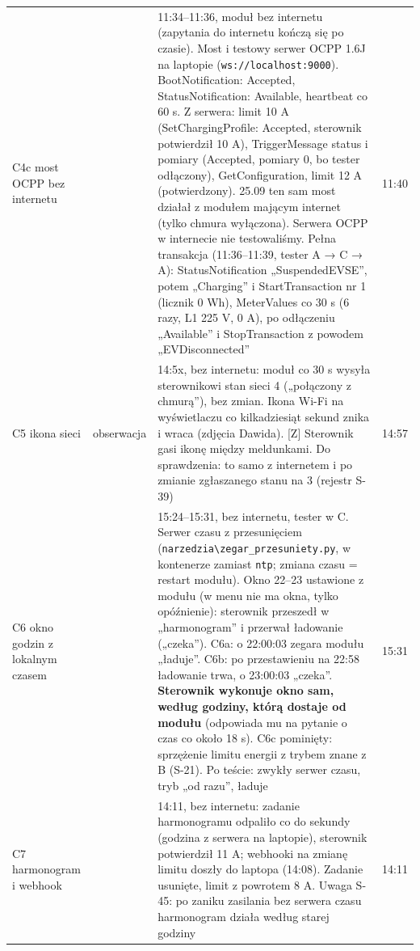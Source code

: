 \documentclass[11pt,a4paper]{article}
\begin{document}
\begin{longtable}{>{\raggedright\arraybackslash}p{3.11cm}>{\raggedright\arraybackslash}p{2.00cm}>{\raggedright\arraybackslash}p{8.57cm}>{\raggedright\arraybackslash}p{1.16cm}}
C4c most OCPP bez internetu & \leavevmode{\symbolfont\color{apgreen}\textbf{✔}} & 01.10 11:34–11:36, moduł bez internetu (zapytania do internetu kończą się po czasie). Most i testowy serwer OCPP 1.6J na laptopie (\texttt{ws:\allowbreak{}/\allowbreak{}/\allowbreak{}localhost:\allowbreak{}9000}). BootNotification: Accepted, StatusNotification: Available, heartbeat co 60 s. Z serwera: limit 10 A (SetChargingProfile: Accepted, sterownik potwierdził 10 A), TriggerMessage status i pomiary (Accepted, pomiary 0, bo tester odłączony), GetConfiguration, limit 12 A (potwierdzony). 25.09 ten sam most działał z modułem mającym internet (tylko chmura wyłączona). Serwera OCPP w internecie nie testowaliśmy. Pełna transakcja \leavevmode{\symbolfont\color{apgreen}\textbf{✔}} (11:36–11:39, tester A {\symbolfont→} C {\symbolfont→} A): StatusNotification „SuspendedEVSE”, potem „Charging” i StartTransaction nr 1 (licznik 0 Wh), MeterValues co 30 s (6 razy, L1 225 V, 0 A), po odłączeniu „Available” i StopTransaction z powodem „EVDisconnected” & 01.10 11:40 \\
C5 ikona sieci & \leavevmode{\symbolfont\color{apamber}\textbf{◐}} obserwacja & 30.09 14:5x, bez internetu: moduł co 30 s wysyła sterownikowi stan sieci 4 („połączony z chmurą”), bez zmian. Ikona Wi-Fi na wyświetlaczu co kilkadziesiąt sekund znika i wraca (zdjęcia Dawida). [Z] Sterownik gasi ikonę między meldunkami. Do sprawdzenia: to samo z internetem i po zmianie zgłaszanego stanu na 3 (rejestr S-39) & 30.09 14:57 \\
C6 okno godzin z lokalnym czasem & \leavevmode{\symbolfont\color{apgreen}\textbf{✔}} & 30.09 15:24–15:31, bez internetu, tester w C. Serwer czasu z przesunięciem (\texttt{narzedzia\textbackslash{}zegar\_\allowbreak{}przesuniety.\allowbreak{}py}, w kontenerze zamiast \texttt{ntp}; zmiana czasu = restart modułu). Okno 22–23 ustawione z modułu (w menu nie ma okna, tylko opóźnienie): sterownik przeszedł w „harmonogram” i przerwał ładowanie („czeka”). C6a: o 22:00:03 zegara modułu „ładuje”. C6b: po przestawieniu na 22:58 ładowanie trwa, o 23:00:03 „czeka”. \textbf{Sterownik wykonuje okno sam, według godziny, którą dostaje od modułu} (odpowiada mu na pytanie o czas co około 18 s). C6c pominięty: sprzężenie limitu energii z trybem znane z B (S-21). Po teście: zwykły serwer czasu, tryb „od razu”, ładuje & 30.09 15:31 \\
C7 harmonogram i webhook & \leavevmode{\symbolfont\color{apgreen}\textbf{✔}} & 30.09 14:11, bez internetu: zadanie harmonogramu odpaliło co do sekundy (godzina z serwera na laptopie), sterownik potwierdził 11 A; webhooki na zmianę limitu doszły do laptopa (14:08). Zadanie usunięte, limit z powrotem 8 A. Uwaga S-45: po zaniku zasilania bez serwera czasu harmonogram działa według starej godziny & 30.09 14:11 \\

\end{longtable}
\end{document}
